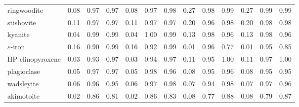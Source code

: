 \begin{table}[!htbp]
\begin{tabular}{@{}l|rrr|rrr|rrr|rrr@{}}
ringwoodite & 0.08 & \cellcolor[RGB]{251,232,231}0.97 & \cellcolor[RGB]{252,237,236}0.97 & 0.08 & \cellcolor[RGB]{251,233,232}0.97 & \cellcolor[RGB]{253,244,244}0.98 & 0.27 & \cellcolor[RGB]{252,239,238}0.98 & \cellcolor[RGB]{254,249,248}0.99 & 0.27 & \cellcolor[RGB]{254,247,246}0.99 & \cellcolor[RGB]{254,248,248}0.99 \\
stishovite & 0.11 & \cellcolor[RGB]{251,233,232}0.97 & \cellcolor[RGB]{252,235,234}0.97 & 0.11 & \cellcolor[RGB]{252,236,235}0.97 & \cellcolor[RGB]{251,234,233}0.97 & 0.20 & \cellcolor[RGB]{251,230,229}0.96 & \cellcolor[RGB]{253,242,241}0.98 & 0.20 & \cellcolor[RGB]{252,239,239}0.98 & \cellcolor[RGB]{253,244,243}0.98 \\
kyanite & 0.04 & \cellcolor[RGB]{254,248,248}0.99 & \cellcolor[RGB]{253,245,245}0.99 & 0.04 & \cellcolor[RGB]{255,253,253}1.00 & \cellcolor[RGB]{254,251,250}0.99 & 0.13 & \cellcolor[RGB]{252,239,238}0.98 & \cellcolor[RGB]{250,227,226}0.96 & 0.13 & \cellcolor[RGB]{253,242,242}0.98 & \cellcolor[RGB]{250,226,224}0.96 \\
$\varepsilon$-iron & 0.16 & \cellcolor[RGB]{244,189,185}0.90 & \cellcolor[RGB]{254,249,248}0.99 & 0.16 & \cellcolor[RGB]{245,199,196}0.92 & \cellcolor[RGB]{254,247,246}0.99 & 0.01 & \cellcolor[RGB]{250,228,227}0.96 & \cellcolor[RGB]{232,120,112}0.77 & 0.01 & \cellcolor[RGB]{249,221,220}0.95 & \cellcolor[RGB]{238,152,146}0.85 \\
HP clinopyroxene & 0.03 & \cellcolor[RGB]{247,211,208}0.93 & \cellcolor[RGB]{252,236,235}0.97 & 0.03 & \cellcolor[RGB]{248,212,210}0.94 & \cellcolor[RGB]{252,236,235}0.97 & 0.11 & \cellcolor[RGB]{249,221,219}0.95 & \cellcolor[RGB]{254,252,252}1.00 & 0.11 & \cellcolor[RGB]{251,233,232}0.97 & \cellcolor[RGB]{255,253,253}1.00 \\
plagioclase & 0.05 & \cellcolor[RGB]{252,236,235}0.97 & \cellcolor[RGB]{251,232,231}0.97 & 0.05 & \cellcolor[RGB]{252,240,239}0.98 & \cellcolor[RGB]{251,231,230}0.96 & 0.08 & \cellcolor[RGB]{249,220,217}0.95 & \cellcolor[RGB]{250,225,223}0.96 & 0.08 & \cellcolor[RGB]{249,220,218}0.95 & \cellcolor[RGB]{249,221,219}0.95 \\
wadsleyite & 0.06 & \cellcolor[RGB]{251,231,230}0.96 & \cellcolor[RGB]{249,222,220}0.95 & 0.06 & \cellcolor[RGB]{252,236,235}0.97 & \cellcolor[RGB]{253,241,240}0.98 & 0.07 & \cellcolor[RGB]{248,216,214}0.94 & \cellcolor[RGB]{252,239,238}0.98 & 0.07 & \cellcolor[RGB]{251,233,232}0.97 & \cellcolor[RGB]{250,228,227}0.96 \\
akimotoite & 0.02 & \cellcolor[RGB]{239,161,155}0.86 & \cellcolor[RGB]{233,125,117}0.81 & 0.02 & \cellcolor[RGB]{239,161,156}0.86 & \cellcolor[RGB]{236,141,134}0.83 & 0.08 & \cellcolor[RGB]{232,120,112}0.77 & \cellcolor[RGB]{242,177,172}0.88 & 0.08 & \cellcolor[RGB]{232,120,112}0.79 & \cellcolor[RGB]{240,168,163}0.87 \\

\end{tabular}
\end{table}
